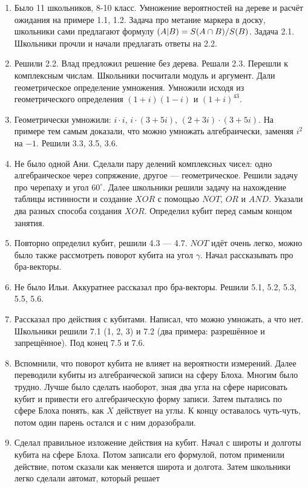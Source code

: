 \documentclass[12pt]{article}
\let\P\relax
\DeclareMathOperator{\P}{\mathbb{P}}
\theoremstyle{definition}
\begin{document}
\begin{enumerate}
  \item Было 11 школьников, 8-10 класс. Умножение вероятностей на дереве и расчёт ожидания на примере 1.1, 1.2.
  Задача про метание маркера в доску, школьники сами предлагают формулу $\P(A|B) = S(A\cap B) / S(B)$. Задача 2.1.
  Школьники прочли и начали предлагать ответы на 2.2.
  \item Решили 2.2. Влад предложил решение без дерева. Решали 2.3.
  Перешли к комплексным числам. Школьники посчитали модуль и аргумент.
  Дали геометрическое определение умножения. Умножили исходя
  из геометрического определения $(1+i)(1-i)$ и $(1+i)^{43}$.
  \item Геометрически умножили: $i\cdot i$, $i\cdot (3+5i)$, $(2+3i)\cdot (3+5i)$.
  На примере тем самым доказали, что можно умножать алгебраически, заменяя $i^2$ на $-1$.
  Решили 3.3, 3.5, 3.6.
  \item Не было одной Ани. Сделали пару делений комплексных чисел: одно алгебраическое через
  сопряжение, другое — геометрическое. Решили задачу про черепаху и угол $60^{\circ}$.
  Далее школьники решили задачу на нахождение таблицы истинности и создание $XOR$ с помощью $NOT$,
  $OR$ и $AND$. Указали два разных способа создания $XOR$. Определил кубит перед
  самым концом занятия.
  \item Повторно определил кубит, решили 4.3 — 4.7. $NOT$ идёт очень легко, можно
  было также рассмотреть поворот кубита на угол $\gamma$. Начал рассказывать
  про бра-векторы.
  \item Не было Ильи. Аккуратнее рассказал про бра-векторы. Решили 5.1, 5.2, 5.3, 5.5, 5.6.
  \item Рассказал про действия с кубитами. Написал, что можно умножать, а что нет.
  Школьники решили 7.1 (1, 2, 3) и 7.2 (два примера: разрешённое и запрещённое). Под конец 7.5 и 7.6.
  \item Вспомнили, что поворот кубита не влияет на вероятности измерений. Далее переводили
  кубиты из алгебраической записи на сферу Блоха. Многим было трудно. Лучше было сделать наоборот,
  зная два угла на сфере нарисовать кубит и привести его алгебраическую форму записи.
  Затем пытались по сфере Блоха понять, как $X$ действует на углы. К концу оставалось
  чуть-чуть, потом один парень остался и с ним доразобрали.
  \item Сделал правильное изложение действия на кубит. Начал с широты и долготы кубита
  на сфере Блоха. Потом записали его формулой, потом применили действие, потом сказали
  как меняется широта и долгота. Затем школьники легко сделали автомат, который решает

\end{enumerate}
\end{document}
